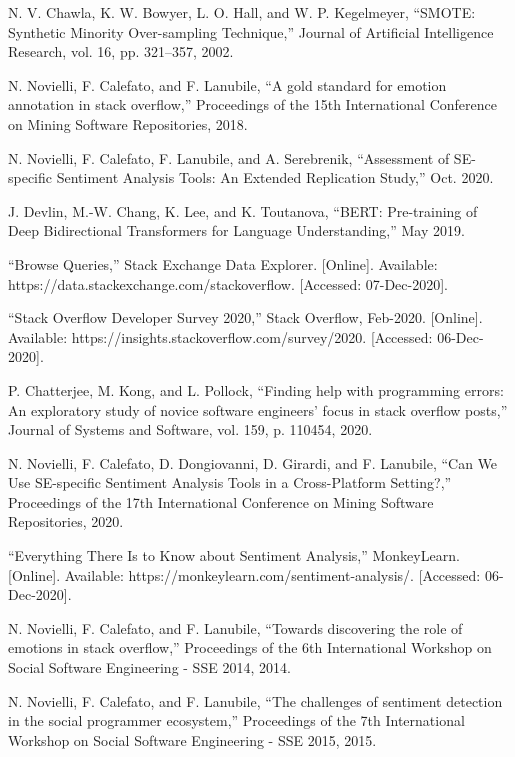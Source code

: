 \documentclass[conference]{IEEEtran}
\begin{document}
\begin{thebibliography}{00}
  N. V. Chawla, K. W. Bowyer, L. O. Hall, and W. P. Kegelmeyer, “SMOTE: Synthetic Minority Over-sampling Technique,” Journal of Artificial Intelligence Research, vol. 16, pp. 321–357, 2002. 

 N. Novielli, F. Calefato, and F. Lanubile, “A gold standard for emotion annotation in stack overflow,” Proceedings of the 15th International Conference on Mining Software Repositories, 2018. 

 N. Novielli, F. Calefato, F. Lanubile, and A. Serebrenik, “Assessment of SE-specific Sentiment Analysis Tools: An Extended Replication Study,” Oct. 2020.

 J. Devlin, M.-W. Chang, K. Lee, and K. Toutanova, “BERT: Pre-training of Deep Bidirectional Transformers for Language Understanding,” May 2019. 

 “Browse Queries,” Stack Exchange Data Explorer. [Online]. Available: https://data.stackexchange.com/stackoverflow. [Accessed: 07-Dec-2020]. 

 “Stack Overflow Developer Survey 2020,” Stack Overflow, Feb-2020. [Online]. Available: https://insights.stackoverflow.com/survey/2020. [Accessed: 06-Dec-2020]. 

 P. Chatterjee, M. Kong, and L. Pollock, “Finding help with programming errors: An exploratory study of novice software engineers’ focus in stack overflow posts,” Journal of Systems and Software, vol. 159, p. 110454, 2020. 

 N. Novielli, F. Calefato, D. Dongiovanni, D. Girardi, and F. Lanubile, “Can We Use SE-specific Sentiment Analysis Tools in a Cross-Platform Setting?,” Proceedings of the 17th International Conference on Mining Software Repositories, 2020. 

 “Everything There Is to Know about Sentiment Analysis,” MonkeyLearn. [Online]. Available: https://monkeylearn.com/sentiment-analysis/. [Accessed: 06-Dec-2020]. 

 N. Novielli, F. Calefato, and F. Lanubile, “Towards discovering the role of emotions in stack overflow,” Proceedings of the 6th International Workshop on Social Software Engineering - SSE 2014, 2014. 

 N. Novielli, F. Calefato, and F. Lanubile, “The challenges of sentiment detection in the social programmer ecosystem,” Proceedings of the 7th International Workshop on Social Software Engineering - SSE 2015, 2015. 


\end{thebibliography}
\end{document}
